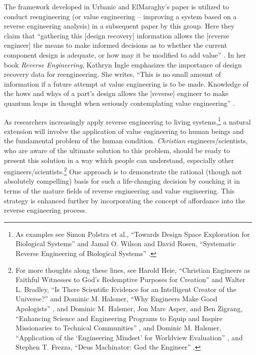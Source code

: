 The framework developed in Urbanic and ElMaraghy's paper is utilized to conduct
reengineering (or value engineering – improving a system based on a
reverse engineering analysis) in a subsequent paper by this group. Here
they claim that ``gathering this [design recovery] information allows
the [reverse engineer] the means to make informed decisions as to
whether the current component design is adequate, or how may it be
modified to add value'' \citep[][p.~166]{urbanicelmaraghy2009b}. In her 
book \textit{Reverse Engineering}, Kathryn Ingle emphasizes the importance of design
recovery data for reengineering. She writes, “This is no small amount
of information if a future attempt at value engineering is to be made.
Knowledge of the hows and whys of a part’s design allows the [reverse]
engineer to make quantum leaps in thought when seriously contemplating
value engineering” \citep[][pp. 65--66]{ingle1994}. 

As researchers increasingly
apply reverse engineering to living systems,\footnote{%
As examples see Simon Polstra et al., “Towards
Design Space Exploration for Biological Systems” 
and Jamal O. Wilson and David Rosen,
“Systematic Reverse Engineering of Biological Systems” \citep{wilsonrosen2007}.
} a
natural extension will involve the application of value engineering to
human beings and the fundamental problem of the human condition. 
\textit{Christian} engineers/scientists, who are aware of the ultimate
solution to this problem, should be ready to present this solution
in a way which people can understand, especially other
\mbox{engineers/scientists}.\footnote{%
For more thoughts along these lines, see Harold
Heie, “Christian Engineers as Faithful Witnesses to God’s Redemptive
Purposes for Creation” \citep{heie1999}
and Walter L. Bradley,
“Is There Scientific Evidence for an Intelligent Creator of the
Universe?” \citep{bradley2003}
and Dominic M. Halsmer, “Why Engineers Make Good Apologists” \citep{halsmer2007},
 and Dominic M. Halsmer, Jon Marc Asper, and Ben Zigrang,
“Enhancing Science and Engineering Programs to Equip and Inspire
Missionaries to Technical Communities” ,
and Dominic M. Halsmer,
“Application of the ‘Engineering Mindset’ for Worldview Evaluation” \citep{halsmer2009},
and Stephen T. Frezza, “Deus Machinator: God the Engineer” \citep{frezza2009}.
} One approach is to
demonstrate the rational (though not absolutely compelling) basis for
such a life-changing decision by couching it in terms of the mature
fields of reverse engineering and value engineering. This strategy is
enhanced further by incorporating the concept of affordance into the
reverse engineering process. 

